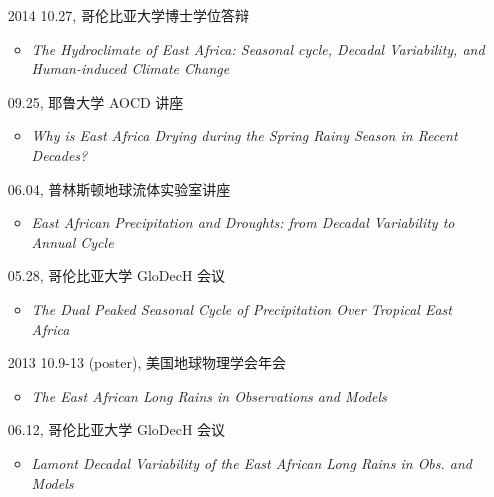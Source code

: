 \documentclass[11pt]{article}
\newcommand{\meetingName}[1]{#1}
\newcommand{\ptitle}[1]{\textit{#1}}
\begin{document}
\begin{CJK*}{UTF8}{gkai}
\begin{itemize}[leftmargin=10ex,label={},noitemsep,nolistsep]
	\item [2014] 10.27,  \meetingName{哥伦比亚大学博士学位答辩}
	\begin{itemize}[leftmargin=4ex,label={},noitemsep,nolistsep]
		\item \ptitle{The Hydroclimate of East Africa: Seasonal cycle, Decadal Variability, and Human-induced Climate Change}
		\end{itemize}
	
	\item[\phantom{2014}] 09.25, \meetingName{耶鲁大学 AOCD 讲座 }
	 \begin{itemize}[leftmargin=4ex,label={},noitemsep,nolistsep]
		\item \ptitle{Why is East Africa Drying during the Spring Rainy Season in Recent Decades?}
		\end{itemize}

	\item [\phantom{2014}]06.04,  \meetingName{普林斯顿地球流体实验室讲座}
	 \begin{itemize}[leftmargin=4ex,label={},noitemsep,nolistsep]
		\item \ptitle{East African Precipitation and Droughts: from Decadal Variability to Annual Cycle}
		\end{itemize}

	\item[\phantom{2014}]05.28,  \meetingName{哥伦比亚大学 GloDecH 会议}
	\begin{itemize}[leftmargin=4ex,label={},noitemsep,nolistsep]
		\item \ptitle{The Dual Peaked Seasonal Cycle of Precipitation Over Tropical East Africa}
		\end{itemize}
	
	\item[2013] 10.9-13 (poster), \meetingName{美国地球物理学会年会}
	\begin{itemize}[leftmargin=4ex,label={},noitemsep,nolistsep]
		\item \ptitle{The East African Long Rains in Observations and Models}
		\end{itemize}
	
	\item [\phantom{2013}] 06.12, \meetingName{哥伦比亚大学 GloDecH 会议}
	\begin{itemize}[leftmargin=4ex,label={},noitemsep,nolistsep]
		\item \ptitle{Lamont Decadal Variability of the East African Long Rains in Obs. and Models}
		\end{itemize}
			

\end{itemize}
\end{CJK*}
\end{document}
